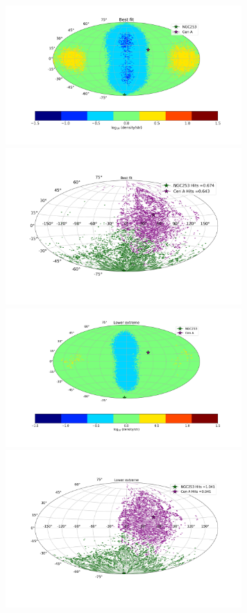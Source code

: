\documentclass[12pt, a4 paper]{article}
\begin{document}
\begin{figure}[h]
\includegraphics[width=9.0cm]{Images/Log_Bins_180_Historgam_BF_N2_Str_Tur_TM_40_EeV.png}
\includegraphics[width=9.0cm]{Images/Bins_180_BF_N2_CenA_NGC253_Str_Tur_TM_40_EeV.png}
\includegraphics[width=9.0cm]{Images/Log_Bins_180_Historgam_LB_N2_Str_Tur_TM_40_EeV.png}
\includegraphics[width=9.0cm]{Images/Bins_180_LB_N2_CenA_NGC253_Str_Tur_TM_40_EeV.png}

\end{figure}
\end{document}
